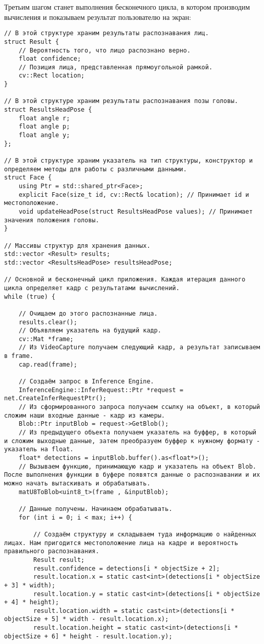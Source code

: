 \documentclass[12pt,a4paper]{scrartcl}
\begin{document}
			Третьим шагом станет выполнения бесконечного цикла, в котором производим вычисления и показываем результат пользователю на экран:
			
			\begin{verbatim}
// В этой структуре храним результаты распознавания лиц.
struct Result {
	// Вероятность того, что лицо распознано верно.
	float confidence;
	// Позиция лица, представленная прямоугольной рамкой.
	cv::Rect location;
}

// В этой структуре храним результаты распознавания позы головы.
struct ResultsHeadPose {
	float angle r;
	float angle p;
	float angle y;
};

// В этой структуре храним указатель на тип структуры, конструктор и определяем методы для работы с различными данными.
struct Face {
	using Ptr = std::shared_ptr<Face>;
	explicit Face(size_t id, cv::Rect& location); // Принимает id и местоположение.
	void updateHeadPose(struct ResultsHeadPose values); // Принимает значения положения головы.
}

// Массивы структур для хранения данных.
std::vector <Result> results;
std::vector <ResultsHeadPose> resultsHeadPose;

// Основной и бесконечный цикл приложения. Каждая итерация данного цикла определяет кадр с результатами вычислений.
while (true) {

	// Очищаем до этого распознанные лица.
	results.clear();
	// Объявляем указатель на будущий кадр.
	cv::Mat *frame;
	// Из VideoCapture получаем следующий кадр, а результат записываем в frame.
	cap.read(frame);
	
	// Создаём запрос в Inference Engine.
	InferenceEngine::InferRequest::Ptr *request = net.CreateInferRequestPtr();
	// Из сформированного запроса получаем ссылку на объект, в который сложим наши входные данные - кадр из камеры.
	Blob::Ptr inputBlob = request->GetBlob();
	// Из предыдущего объекта получаем указатель на буффер, в который и сложим выходные данные, затем преобразуем буффер к нужному формату - указатель на float.
	float* detections = inputBlob.buffer().as<float*>();
	// Вызываем функцию, принимающую кадр и указатель на объект Blob. После выполнения функции в буфере появятся данные о распознавании и их можно начать вытаскивать и обрабатывать.
	matU8ToBlob<uint8_t>(frame , &inputBlob);
	
	// Данные получены. Начинаем обрабатывать.
	for (int i = 0; i < max; i++) {
	
		// Создаём структуру и складываем туда информацию о найденных лицах. Нам пригодится местоположение лица на кадре и вероятность правильного распознавания.
		Result result;
		result.confidence = detections[i * objectSize + 2];
		result.location.x = static cast<int>(detections[i * objectSize + 3] * width);
		result.location.y = static cast<int>(detections[i * objectSize + 4] * height);
		result.location.width = static cast<int>(detections[i * objectSize + 5] * width - result.location.x);
		result.location.height = static cast<int>(detections[i * objectSize + 6] * height - result.location.y);
		

\end{verbatim}
\end{document}
